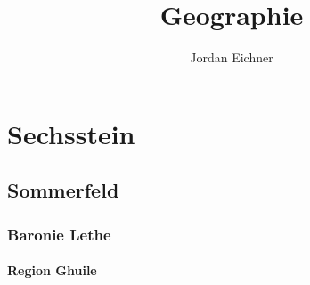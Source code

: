 \documentclass[a4paper,12pt,oneside]{book}
\title{Geographie}
\author{Jordan Eichner}
\date{}
\begin{document}
\maketitle
\tableofcontents

\part{Sechsstein}

\chapter{Sommerfeld}

\section{Baronie Lethe}

\subsection{Region Ghuile}
\end{document}
